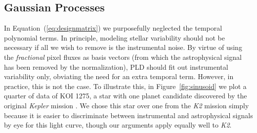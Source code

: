 \documentclass[]{emulateapj}
\begin{document}
\subsection{Gaussian Processes}
\label{sec:gp}
\begin{figure*}[t]
  \begin{center}
    \leavevmode
       \caption{Different de-trending techniques for quarter 4 of KIC 8583696 (KOI 1275),
                a planet candidate host from the original \emph{Kepler} mission. The original
                data is shown in the left column; in the other columns we
                artificially injected a sinusoidal signal with a period
                of 25 days and an amplitude comparable to that of the instrumental variability.
                The top row shows the raw SAP data (black) and the first order
                PLD model (red); the residuals of the fit are indicated directly below. 
                The third row shows the final residuals after smoothing 
                with a GP to eliminate low-frequency stellar variability. Finally, the bottom
                row shows these residuals folded on the orbital period of the planet
                candidate (black), with the 5-hr median indicated in red. Combining PLD with a GP
                ensures PLD fits out only the instrumental variability without inflating the white noise.
                }
     \label{fig:sinusoid}
  \end{center}
\end{figure*}

In Equation~(\ref{eq:designmatrix}) we purposefully neglected the temporal polynomial
terms. In principle, modeling stellar variability should not be necessary if all we wish 
to remove is the instrumental noise. By virtue of using the
\emph{fractional} pixel fluxes as basis vectors (from which the astrophysical signal
has been removed by the normalization), PLD should fit out instrumental variability only,
obviating the need for an extra temporal term. However, in practice, this is not
the case. To illustrate this, in Figure~\ref{fig:sinusoid} we plot a quarter of data
of KOI 1275, a star with one planet candidate discovered by the original \emph{Kepler}
mission \citep{BOR11}. We chose this star over one from the \emph{K2}
mission simply because it is easier to discriminate between instrumental and
astrophysical signals by eye for this light curve, though our arguments apply
equally well to \emph{K2}.
\end{document}
